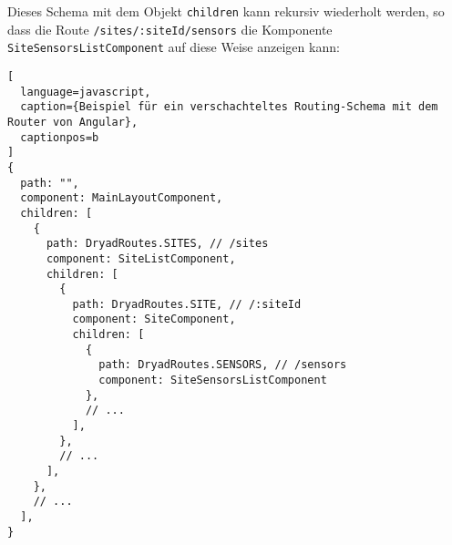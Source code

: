 Dieses Schema mit dem Objekt \lstinline{children} kann rekursiv wiederholt werden, so dass die Route \lstinline{/sites/:siteId/sensors} die Komponente \lstinline{SiteSensorsListComponent} auf diese Weise anzeigen kann:

\begin{lstlisting}[
  language=javascript,
  caption={Beispiel für ein verschachteltes Routing-Schema mit dem Router von Angular},
  captionpos=b
]
{
  path: "",
  component: MainLayoutComponent,
  children: [
    { 
      path: DryadRoutes.SITES, // /sites
      component: SiteListComponent,
      children: [
        { 
          path: DryadRoutes.SITE, // /:siteId
          component: SiteComponent,
          children: [
            { 
              path: DryadRoutes.SENSORS, // /sensors
              component: SiteSensorsListComponent
            },
            // ...
          ],
        },
        // ...
      ],
    },
    // ...
  ],
}
\end{lstlisting}
